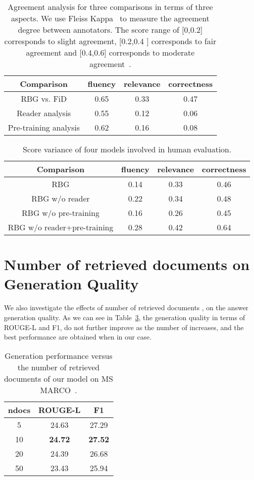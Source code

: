 \documentclass[11pt]{article}
\begin{document}
\begin{table}[!ht]
\centering
\resizebox{0.45\textwidth}{!}
{
\begin{tabular}{c|ccc}
\hline
Comparison    & fluency & relevance & correctness  \\ \hline
RBG vs. FiD  &    0.65 &    0.33 &    0.47 \\
Reader analysis  & 0.55 &    0.12 &    0.06  \\
Pre-training analysis&  0.62 &    0.16 &    0.08 \\ \hline
\end{tabular}
}
\caption{Agreement analysis for three comparisons in terms of three aspects. We use Fleiss Kappa~\cite{fleiss_kappa} to measure the agreement degree between annotators. The score range of [0,0.2] corresponds to slight agreement, [0.2,0.4 ] corresponds to fair agreement and [0.4,0.6] corresponds to moderate agreement~\cite{landis1977measurement}.}
\label{tab:agreement}
\end{table}

\begin{table}[!ht]
\centering
\resizebox{0.45\textwidth}{!}
{
\begin{tabular}{c|ccc}
\hline
Comparison    & fluency & relevance & correctness  \\ \hline
RBG  &    0.14 &    0.33 &    0.46 \\
RBG w/o reader & 0.22 &    0.34 &    0.48 \\
RBG w/o pre-training &  0.16 &    0.26 &    0.45 \\ 
RBG w/o reader+pre-training &  0.28 &    0.42 &    0.64 \\ \hline
\end{tabular}
}
\caption{Score variance of four models involved in human evaluation. }
\label{tab:variance}
\end{table}

\section{Number of retrieved documents on Generation Quality}

We also investigate the effects of number of retrieved documents , on the answer generation quality. As we can see in Table~\ref{tab:results_k}, the generation quality in terms of ROUGE-L and F1, do not further improve as the number of  increases, and the best performance are obtained when  in our case.

\begin{table}[]\small
\centering
\begin{tabular}{c|cc}
\hline
ndocs & ROUGE-L & F1    \\ \hline
5     & 24.63   & 27.29 \\
10    & \textbf{24.72}   & \textbf{27.52} \\
20    & 24.39   & 26.68 \\
50    & 23.43   & 25.94 \\ \hline
\end{tabular}
\caption{Generation performance versus the number of retrieved documents of our model on MS MARCO~\cite{nguyen2016ms}.}
\label{tab:results_k}
\end{table}
\end{document}
